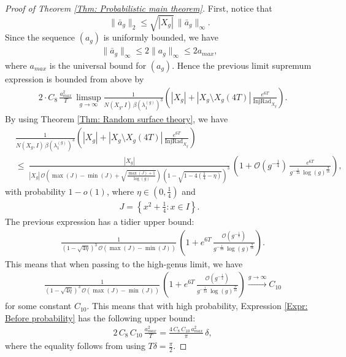 \documentclass[11pt,twoside,reqno]{amsart} \usepackage{a4wide} \usepackage[T1]{fontenc} \usepackage[utf8]{inputenc} \usepackage{soul}  \usepackage{amsmath} \usepackage{amsfonts} \usepackage{amssymb} \usepackage{mathtools} \usepackage{amsthm} \usepackage{xcolor} \usepackage{graphicx} \usepackage{hyperref} \usepackage{standalone} \usepackage{esint} \usepackage{comment} \usepackage[left=2.3cm,top=3cm,right=2.3cm]{geometry} \usepackage{bm} \usepackage{svg} \usepackage{float} \numberwithin{equation}{section} \theoremstyle{plain} \newtheorem{thm}{Theorem}[section] \newtheorem{theorem}[thm]{Theorem} \newtheorem*{theorem*}{Theorem}\newtheorem{conj}[thm]{Conjecture} \newtheorem{lemma}[thm]{Lemma} \newtheorem{prop}[thm]{Proposition} \newtheorem{proposition}[thm]{Proposition} \newtheorem{cor}[thm]{Corollary} \newtheorem{question}[thm]{Question} \newtheorem{corollary}[thm]{Corollary} \newtheorem{assumption}[thm]{Assumption} \theoremstyle{definition} \newtheorem{defn}[thm]{Definition} \newtheorem{choice}[thm]{Choice} \newtheorem{definition}[thm]{Definition} \newtheorem{ex}[thm]{Example} \newtheorem{notation}[thm]{Notation} \newtheorem*{ack}{Acknowledgements} \theoremstyle{remark} \newtheorem{remark}[thm]{Remark} \newtheorem{bigremark}[thm]{Remark} \usepackage{xcolor} \newcommand{\red}[1]{ {\color{Red}#1} } \newcommand{\blue}[1]{ {\color{Blue}#1} } \author{Kai Hippi} \address{Aalto University, Espoo, Finland} \email{kai.hippi@aalto.fi}
\begin{document}
\begin{proof}[Proof of Theorem \ref{Thm: Probabilistic main theorem}]
	First, notice that 
	$$ \| \bar{a}_{g} \|_{2} \leq \sqrt{| X_{g} |} \, \| \bar{a}_{g }\|_{\infty} .$$ 
	Since the sequence $ ( a_{g} ) $ is uniformly bounded, we have
	\begin{align*}
		\| \bar{a}_{g}\|_{\infty} \leq 2 \| a_{g} \|_{\infty} \leq 2 a_{max},
	\end{align*}
	where $ a_{max} $ is the universal bound for $ ( a_{g} ) $. Hence the previous limit supremum expression is bounded from above by
	\begin{align}
		&
		\label{Expr: Before probability}
		2 \cdot C_{8} \, \frac{ a_{max}^{2} }{ T } \, \limsup_{g \to \infty}  \frac{1}{ N( X_{g}, I ) \, \beta( \lambda_{1}^{( g )} )^{3} } \left( | X_{g} | +  | X_{g} \setminus X_{g}( 4T ) | \, \frac{ e^{6T} }{ \operatorname{InjRad}_{X_{g}} } \right).
	\end{align}
	By using Theorem \ref{Thm: Random surface theory}, we have 	
	\begin{align*}
		&
		\frac{1}{ N( X_{g}, I ) \, \beta( \lambda_{1}^{( g )} )^{3} } \left( | X_{g} | + | X_{g} \setminus X_{g}( 4T ) | \, \frac{ e^{6T} }{ \operatorname{InjRad}_{X_{g}} } \right)
		\\
		& \leq \
		\frac{| X_{g} |}{ | X_{g} | \, \mathcal{O}\left( \max( J ) - \min( J ) + \sqrt{ \frac{ \max( J  ) + 1 }{ \log( g ) } } \right) \, \left( 1 - \sqrt{ 1 - 4( \tfrac{1}{4} - \eta ) } \right)^{3}} \, \left( 1 + \mathcal{O}( g^{ - \frac{1}{4} } ) \, \frac{e^{6T}}{ g^{ - \frac{1}{24}  } \, \log( g )^{ \frac{9}{16} } } \right),
	\end{align*}
	with probability $ 1 - o( 1 ) $, where $ \eta \in ( 0, \tfrac{1}{4} ) $ and
	\begin{align*}
		J = \left \{ x^{2} + \tfrac{1}{4} : x \in I \right \}.
	\end{align*}
	The previous expression has a tidier upper bound:
	\begin{align*}
		&
		\frac{ 1 }{ \left( 1 - \sqrt{ 4 \eta } \right)^{3} \, \mathcal{O}( \max( J ) - \min( J ) ) } \, \left( 1 +  e^{6T} \, \frac{ \mathcal{O}( g^{ -\frac{1}{4} } ) }{ g^{ - \frac{1}{24} } \, \log( g )^{ \frac{9}{16} } }  \right).
	\end{align*}
	This means that when passing to the high-genus limit, we have
	\begin{align*}
		&
		\frac{ 1 }{ \left( 1 - \sqrt{ 4 \eta } \right)^{3} \, \mathcal{O}( \max( J ) - \min( J ) ) } \, \left( 1 +  e^{6T} \, \frac{ \mathcal{O}( g^{ -\frac{1}{4} } ) }{ g^{ - \frac{1}{24} } \, \log( g )^{ \frac{9}{16} } }  \right) \xrightarrow{g \to \infty} C_{10}
	\end{align*}
	for some constant $ C_{10} $. This means that with high probability, Expression \eqref{Expr: Before probability} has the following upper bound:
	\begin{align*}
		&
		2 \, C_{8} \, C_{ 10 } \, \frac{a_{max}^{2}}{ T } = \frac{4 \, C_{8} \, C_{10} \, a_{max}^{2}}{\pi} \, \delta,
	\end{align*}
	where the equality follows from using $ T  \delta = \tfrac{\pi}{2} $.
	

\end{proof}
\end{document}
